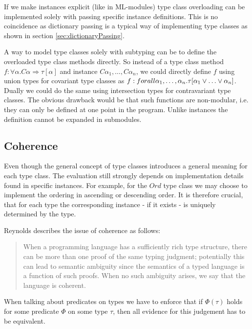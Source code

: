 If we make instances explicit (like in ML-modules) type class overloading can be implemented solely with passing specific instance definitions.
This is no coincidence as dictionary passing is a typical way of implementing type classes as shown in section \ref{sec:dictionaryPassing}.

A way to model type classes solely with subtyping can be to define the overloaded type class methods directly.
So instead of a type class method $f : \forall \alpha. C \alpha \Rightarrow \tau[\alpha]$ and instance $C \alpha_1, \dots, C \alpha_n$,
we could directly define $f$ using union types for covariant type classes as $f : forall \alpha_1,\dots,\alpha_n. \tau[\alpha_1 \join \dots \join \alpha_n]$.
Dually we could do the same using intersection types for contravariant type classes.
The obvious drawback would be that such functions are non-modular, i.e. they can only be defined at one point in the program.
Unlike instances the definition cannot be expanded in submodules.

\subsection{Coherence}\label{sec:coherence}

Even though the general concept of type classes introduces a general meaning for each type class.
The evaluation still strongly depends on implementation details found in specific instances.
For example, for the $\mathit{Ord}$ type class we may choose to implement the ordering in ascending or descending order.
It is therefore crucial, that for each type the corresponding instance - if it exists - is uniquely determined by the type.

Reynolds \cite{reynolds_coherence} describes the issue of coherence as follows:

\begin{quote}
    When a programming language has a sufficiently rich type structure, there can be more than one proof of the same
    typing judgment; potentially this can lead to semantic ambiguity since the semantics of a typed language is a function
    of such proofs. When no such ambiguity arises, we say that the language is coherent.
\end{quote}

When talking about predicates on types we have to enforce that if $\Phi(\tau)$ holds for some predicate $\Phi$ on some type $\tau$,
then all evidence for this judgement has to be equivalent.

